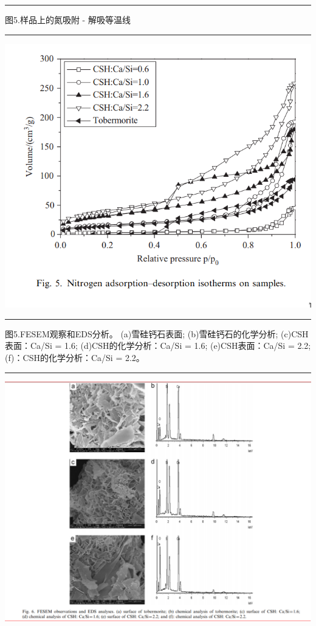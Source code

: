 \documentclass[11pt]{article}
\begin{document}
\noindent\rule{\textwidth}{0.5pt}
图5.样品上的氮吸附 - 解吸等温线

\noindent\rule{\textwidth}{0.5pt}
\includegraphics[scale=0.5]{fig.5.png}

\noindent\rule{\textwidth}{0.5pt}
图5.FESEM观察和EDS分析。 (a)雪硅钙石表面; (b)雪硅钙石的化学分析; (c)CSH表面：Ca/Si = 1.6; (d)CSH的化学分析：Ca/Si = 1.6; (e)CSH表面：Ca/Si = 2.2; (f)：CSH的化学分析：Ca/Si = 2.2。

\noindent\rule{\textwidth}{0.5pt}
\includegraphics[scale=0.5]{fig.6.png}
\end{document}
